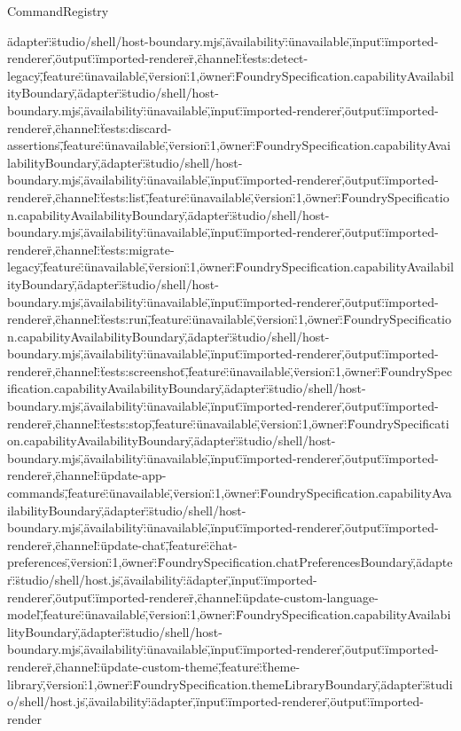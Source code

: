 \begin{lexlean}{CommandRegistry}
\begin{semanticmodule}
{\"adapter\":\"studio/shell/host-boundary.mjs\",\"availability\":\"unavailable\",\"input\":\"imported-renderer\",\"output\":\"imported-renderer\"},{\"channel\":\"tests:detect-legacy\",\"feature\":\"unavailable\",\"version\":1,\"owner\":\"FoundrySpecification.capabilityAvailabilityBoundary\",\"adapter\":\"studio/shell/host-boundary.mjs\",\"availability\":\"unavailable\",\"input\":\"imported-renderer\",\"output\":\"imported-renderer\"},{\"channel\":\"tests:discard-assertions\",\"feature\":\"unavailable\",\"version\":1,\"owner\":\"FoundrySpecification.capabilityAvailabilityBoundary\",\"adapter\":\"studio/shell/host-boundary.mjs\",\"availability\":\"unavailable\",\"input\":\"imported-renderer\",\"output\":\"imported-renderer\"},{\"channel\":\"tests:list\",\"feature\":\"unavailable\",\"version\":1,\"owner\":\"FoundrySpecification.capabilityAvailabilityBoundary\",\"adapter\":\"studio/shell/host-boundary.mjs\",\"availability\":\"unavailable\",\"input\":\"imported-renderer\",\"output\":\"imported-renderer\"},{\"channel\":\"tests:migrate-legacy\",\"feature\":\"unavailable\",\"version\":1,\"owner\":\"FoundrySpecification.capabilityAvailabilityBoundary\",\"adapter\":\"studio/shell/host-boundary.mjs\",\"availability\":\"unavailable\",\"input\":\"imported-renderer\",\"output\":\"imported-renderer\"},{\"channel\":\"tests:run\",\"feature\":\"unavailable\",\"version\":1,\"owner\":\"FoundrySpecification.capabilityAvailabilityBoundary\",\"adapter\":\"studio/shell/host-boundary.mjs\",\"availability\":\"unavailable\",\"input\":\"imported-renderer\",\"output\":\"imported-renderer\"},{\"channel\":\"tests:screenshot\",\"feature\":\"unavailable\",\"version\":1,\"owner\":\"FoundrySpecification.capabilityAvailabilityBoundary\",\"adapter\":\"studio/shell/host-boundary.mjs\",\"availability\":\"unavailable\",\"input\":\"imported-renderer\",\"output\":\"imported-renderer\"},{\"channel\":\"tests:stop\",\"feature\":\"unavailable\",\"version\":1,\"owner\":\"FoundrySpecification.capabilityAvailabilityBoundary\",\"adapter\":\"studio/shell/host-boundary.mjs\",\"availability\":\"unavailable\",\"input\":\"imported-renderer\",\"output\":\"imported-renderer\"},{\"channel\":\"update-app-commands\",\"feature\":\"unavailable\",\"version\":1,\"owner\":\"FoundrySpecification.capabilityAvailabilityBoundary\",\"adapter\":\"studio/shell/host-boundary.mjs\",\"availability\":\"unavailable\",\"input\":\"imported-renderer\",\"output\":\"imported-renderer\"},{\"channel\":\"update-chat\",\"feature\":\"chat-preferences\",\"version\":1,\"owner\":\"FoundrySpecification.chatPreferencesBoundary\",\"adapter\":\"studio/shell/host.js\",\"availability\":\"adapter\",\"input\":\"imported-renderer\",\"output\":\"imported-renderer\"},{\"channel\":\"update-custom-language-model\",\"feature\":\"unavailable\",\"version\":1,\"owner\":\"FoundrySpecification.capabilityAvailabilityBoundary\",\"adapter\":\"studio/shell/host-boundary.mjs\",\"availability\":\"unavailable\",\"input\":\"imported-renderer\",\"output\":\"imported-renderer\"},{\"channel\":\"update-custom-theme\",\"feature\":\"theme-library\",\"version\":1,\"owner\":\"FoundrySpecification.themeLibraryBoundary\",\"adapter\":\"studio/shell/host.js\",\"availability\":\"adapter\",\"input\":\"imported-renderer\",\"output\":\"imported-render}
\end{semanticmodule}
\end{lexlean}
